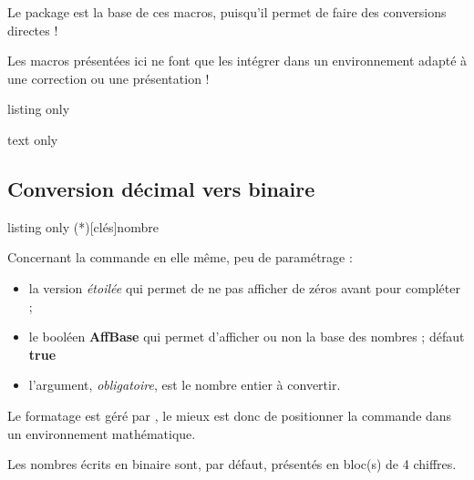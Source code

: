 \documentclass[a4paper,french,11pt]{article}
\newcommand\ctex[1]{\tcbox[vignettelatex]{#1}}
\newcommand\Cle[1]{{\bfseries\sffamily\textlangle #1\textrangle}}
\begin{document}
\begin{noteblock}
Le package \ctex{xintbinhex} est la base de ces macros, puisqu'il permet de faire des conversions directes !

\smallskip

Les macros présentées ici ne font que les intégrer dans un environnement adapté à une correction ou une présentation !
\end{noteblock}

\begin{PresCodeTexPL}{listing only}
\end{PresCodeTexPL}

\begin{PresCodeSortiePL}{text only}






\end{PresCodeSortiePL}

\subsection{Conversion décimal vers binaire}

\begin{PresCodeTexPL}{listing only}
\ConversionDecBin(*)[clés]{nombre}
\end{PresCodeTexPL}

\begin{cautionblock}
Concernant la commande en elle même, peu de paramétrage :

\begin{itemize}
	\item la version \textit{étoilée} qui permet de ne pas afficher de zéros avant pour \og compléter \fg{} ;
	\item le booléen \Cle{AffBase} qui permet d'afficher ou non la base des nombres ; \hfill{}défaut \Cle{true}
	\item l'argument, \textit{obligatoire}, est le nombre entier à convertir.
\end{itemize}

Le formatage est géré par \ctex{sinuitx}, le mieux est donc de positionner la commande dans un environnement mathématique.

\smallskip

Les nombres écrits en binaire sont, par défaut, présentés en bloc(s) de 4 chiffres.
\end{cautionblock}
\end{document}
